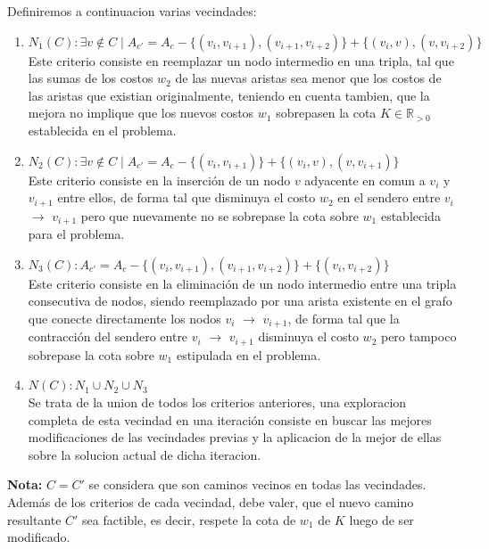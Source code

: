 Definiremos a continuacion varias vecindades:
\begin{enumerate}
    \item $ N_1(C): \exists v \notin C \mid A_{c'} = A_c - \{(v_i,v_{i+1}),(v_{i+1},v_{i+2})\} + \{(v_i,v),(v,v_{i+2})\}$\\
    	Este criterio consiste en reemplazar un nodo intermedio en una tripla, tal que las sumas de los costos $w_2$ de las nuevas aristas sea menor que los costos de las aristas que existian originalmente, teniendo en cuenta tambien, que la mejora no implique que los nuevos costos $w_1$ sobrepasen la cota $K \in \mathbb{R}_{>0}$ establecida en el problema.
    \item $ N_2(C): \exists v \notin C \mid A_{c'} = A_c - \{(v_i,v_{i+1})\} + \{(v_i,v),(v,v_{i+1})\}$\\
    	Este criterio consiste en la inserci\'on de un nodo $v$ adyacente en comun a $v_i$ y $v_{i+1}$ entre ellos, de forma tal que disminuya el costo $w_2$ en el sendero entre $v_i$ $\rightarrow$ $v_{i+1}$ pero que nuevamente no se sobrepase la cota sobre $w_1$ establecida para el problema.
    \item $ N_3(C):  A_{c'} = A_c - \{(v_i,v_{i+1}), (v_{i+1},v_{i+2})\} + \{(v_i,v_{i+2})\}$\\
    	Este criterio consiste en la eliminaci\'on de un nodo intermedio entre una tripla consecutiva de nodos, siendo reemplazado por una arista existente en el grafo que conecte directamente los nodos $v_i$ $\rightarrow$ $v_{i+1}$, de forma tal que la contracci\'on del sendero entre $v_i$ $\rightarrow$ $v_{i+1}$ disminuya el costo $w_2$ pero tampoco sobrepase la cota sobre $w_1$ estipulada en el problema.
    \item $N(C): N_1 \cup N_2 \cup N_3$\\
    	Se trata de la union de todos los criterios anteriores, una exploracion completa de esta vecindad en una iteraci\'on consiste en buscar las mejores modificaciones de las vecindades previas y la aplicacion de la mejor de ellas sobre la solucion actual de dicha iteracion.
\end{enumerate}

\textbf{Nota:} $C = C'$ se considera que son caminos vecinos en todas las vecindades. Adem\'as de los criterios de cada vecindad, debe valer, que el nuevo camino resultante $C'$ sea factible, es decir, respete la cota de $w_1$ de $K$ luego de ser modificado.

